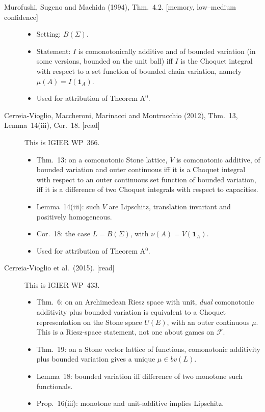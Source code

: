 \begin{description}
\item[Murofushi, Sugeno and Machida (1994), Thm.~4.2. {[memory, low--medium confidence]}]
  \begin{itemize}
  \item Setting: $B(\Sigma)$.
  \item Statement: $I$ is comonotonically additive and of bounded variation (in some versions, bounded on the unit ball) iff $I$ is the Choquet integral with respect to a set function of bounded chain variation, namely $\mu(A)=I(\mathbf 1_A)$.
  \item Used for attribution of Theorem A$^0$.
  \end{itemize}
\item[Cerreia-Vioglio, Maccheroni, Marinacci and Montrucchio (2012), Thm.~13, Lemma~14(iii), Cor.~18. {[read]}] This is IGIER WP~366.
  \begin{itemize}
  \item Thm.~13: on a comonotonic Stone lattice, $V$ is comonotonic additive, of bounded variation and outer continuous iff it is a Choquet integral with respect to an outer continuous set function of bounded variation, iff it is a difference of two Choquet integrals with respect to capacities.
  \item Lemma~14(iii): such $V$ are Lipschitz, translation invariant and positively homogeneous.
  \item Cor.~18: the case $L=B(\Sigma)$, with $\nu(A)=V(\mathbf 1_A)$.
  \item Used for attribution of Theorem A$^0$.
  \end{itemize}
\item[Cerreia-Vioglio et al.\ (2015). {[read]}] This is IGIER WP~433.
  \begin{itemize}
  \item Thm.~6: on an Archimedean Riesz space with unit, \emph{dual} comonotonic additivity plus bounded variation is equivalent to a Choquet representation on the Stone space $U(E)$, with an outer continuous $\mu$. This is a Riesz-space statement, not one about games on $\mathcal F$.
  \item Thm.~19: on a Stone vector lattice of functions, comonotonic additivity plus bounded variation gives a unique $\mu\in bv(L)$.
  \item Lemma~18: bounded variation iff difference of two monotone such functionals.
  \item Prop.~16(iii): monotone and unit-additive implies Lipschitz.

\end{itemize}
\end{description}
